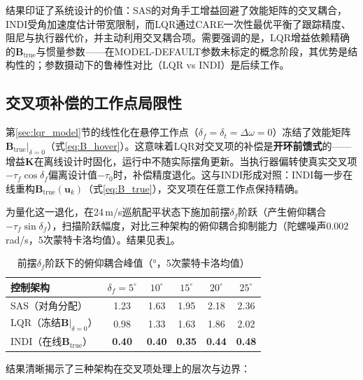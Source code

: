 结果印证了系统设计的价值：SAS的对角手工增益回避了效能矩阵的交叉耦合，INDI受角加速度估计带宽限制，而LQR通过CARE一次性最优平衡了跟踪精度、阻尼与执行器代价，并主动利用交叉耦合项。需要强调的是，LQR增益依赖精确的$\mathbf{B}_{\mathrm{true}}$与惯量参数——在MODEL-DEFAULT参数未标定的概念阶段，其优势是结构性的；参数摄动下的鲁棒性对比（LQR vs INDI）是后续工作。

\subsection{交叉项补偿的工作点局限性}
\label{sec:lqr_coupling_limit}

第\ref{sec:lqr_model}节的线性化在悬停工作点（$\delta_f=\delta_t=\Delta\omega=0$）冻结了效能矩阵$\mathbf{B}_{\mathrm{true}}|_{\delta=0}$（式\ref{eq:B_hover}）。这意味着LQR对交叉项的补偿是\textbf{开环前馈式}的——增益$\mathbf{K}$在离线设计时固化，运行中不随实际摆角更新。当执行器偏转使真实交叉项$-\tau_f\cos\delta_f$偏离设计值$-\tau_0$时，补偿精度退化。这与INDI形成对照：INDI每一步在线重构$\mathbf{B}_{\mathrm{true}}(\mathbf{u}_k)$（式\ref{eq:B_true}），交叉项在任意工作点保持精确。

为量化这一退化，在24\,m/s巡航配平状态下施加前摆$\delta_f$阶跃（产生俯仰耦合$-\tau_f\sin\delta_f$），扫描阶跃幅度，对比三种架构的俯仰耦合抑制能力（陀螺噪声$0.002$\,rad/s，5次蒙特卡洛均值）。结果见表\ref{tab:lqr_coupling_deg}。

\begin{table}[H]
\centering
\caption{前摆$\delta_f$阶跃下的俯仰耦合峰值（°，5次蒙特卡洛均值）}
\label{tab:lqr_coupling_deg}
\small
\begin{tabular}{l c c c c c}
\toprule
\textbf{控制架构} & $\delta_f=5^\circ$ & $10^\circ$ & $15^\circ$ & $20^\circ$ & $25^\circ$ \\
\midrule
SAS（对角分配） & 1.23 & 1.63 & 1.95 & 2.18 & 2.36 \\
LQR（冻结$\mathbf{B}|_{\delta=0}$） & 0.98 & 1.33 & 1.63 & 1.86 & 2.02 \\
INDI（在线$\mathbf{B}_{\mathrm{true}}$） & \textbf{0.40} & \textbf{0.40} & \textbf{0.35} & \textbf{0.44} & \textbf{0.48} \\
\bottomrule
\end{tabular}
\end{table}

结果清晰揭示了三种架构在交叉项处理上的层次与边界：

